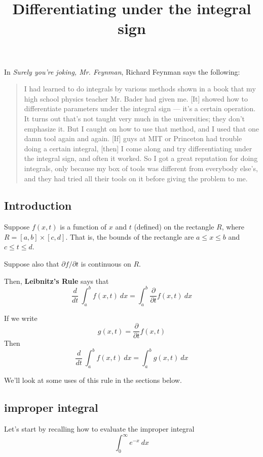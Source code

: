 \documentclass[11pt, oneside]{article}
\title{Differentiating under the integral sign}
\date{}
\begin{document}
\maketitle
\Large

\label{sec:Differentiating_under_the_integral_sign}

In \emph{Surely you're joking, Mr. Feynman}, Richard Feynman says the following:

\begin{quote}I had learned to do integrals by various methods shown in a book that my high school physics teacher Mr. Bader had given me. [It] showed how to differentiate parameters under the integral sign --- it's a certain operation. It turns out that's not taught very much in the universities; they don't emphasize it. But I caught on how to use that method, and I used that one damn tool again and again. [If] guys at MIT or Princeton had trouble doing a certain integral, [then] I come along and try differentiating under the integral sign, and often it worked. So I got a great reputation for doing integrals, only because my box of tools was different from everybody else's, and they had tried all their tools on it before giving the problem to me.\end{quote}

\subsection*{Introduction}

Suppose $f(x,t)$ is a function of $x$ and $t$ (defined) on the rectangle $R$, where $R = [a,b] \times [c,d]$.  That is, the bounds of the rectangle are $a \le x \le b$ and $c \le t \le  d$.

Suppose also that $\partial f/\partial t$ is continuous on $R$.

Then, \textbf{Leibnitz's Rule} says that
\[ \frac{d}{dt} \ \int_a^b f(x,t) \ dx =  \int_a^b  \frac{\partial}{\partial t}  f(x,t) \ dx \]

If we write
\[ g(x,t) = \frac{\partial}{\partial t}  f(x,t)\]
Then
\[ \frac{d}{dt} \ \int_a^b f(x,t) \ dx =  \int_a^b  g(x,t) \ dx \]

We'll look at some uses of this rule in the sections below.

\subsection*{improper integral}
Let's start by recalling how to evaluate the improper integral
\[ \int_0^{\infty} e^{-x} \ dx \]
\end{document}

